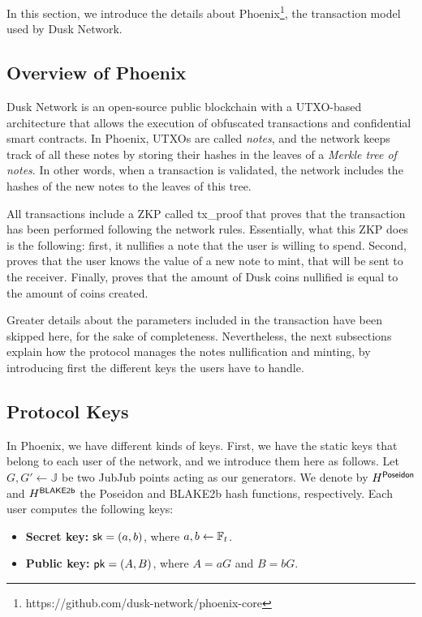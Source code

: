 
In this section, we introduce the details about Phoenix\footnote{https://github.com/dusk-network/phoenix-core}, the transaction model used by Dusk Network. 

\subsection{Overview of Phoenix}

Dusk Network is an open-source public blockchain with a UTXO-based architecture that allows the execution of obfuscated transactions and confidential smart contracts. In Phoenix, UTXOs are called {\textit{notes}}, and the network keeps track of all these notes by storing their hashes in the leaves of a \textit{Merkle tree of notes}. In other words, when a transaction is validated, the network includes the hashes of the new notes to the leaves of this tree. 

All transactions include a ZKP called \textsf{tx\_proof} that proves that the transaction has been performed following the network rules. Essentially, what this ZKP does is the following: first, it nullifies a note that the user is willing to spend. Second, proves that the user knows the value of a new note to mint, that will be sent to the receiver. Finally, proves that the amount of Dusk coins nullified is equal to the amount of coins created.

Greater details about the parameters included in the transaction have been skipped here, for the sake of completeness. Nevertheless, the next subsections explain how the protocol manages the notes nullification and minting, by introducing first the different keys the users have to handle.

\subsection{Protocol Keys}
\label{sec:protocol-keys}

In Phoenix, we have different kinds of keys. First, we have the static keys that belong to each user of the network, and we introduce them here as follows. Let $G, G'\gets\mathbb{J}$ be two JubJub points acting as our generators. We denote by $H^\mathsf{Poseidon}$ and $H^\mathsf{BLAKE2b}$ the Poseidon and BLAKE2b hash functions, respectively. Each user computes the following keys:

\begin{itemize}
	\item \textbf{Secret key:} $\mathsf{sk} = (a,b)$, where $a,b\gets \mathbb{F}_t$.
	\item \textbf{Public key:} $\mathsf{pk} = (A,B)$, where $A = a G$ and $B = b G$.
\end{itemize}

